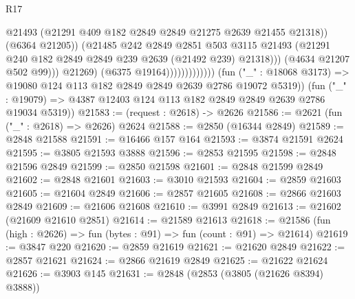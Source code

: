 \begin{lexlean}{R17}
\begin{coremodule}
                                            @21493
                                            (@21291
                                              @409
                                              @182
                                              @2849
                                              @2849
                                              @21275
                                              @2639
                                              @21455
                                              @21318))
                                          (@6364 @21205))
                                        (@21485
                                          @242
                                          @2849
                                          @2851
                                          @503
                                          @3115
                                          @21493
                                          (@21291
                                            @240
                                            @182
                                            @2849
                                            @2849
                                            @239
                                            @2639
                                            (@21492 @239)
                                            @21318)))
                                      (@4634 @21207 @502 @99)))
                                  @21269)
                                (@6375 @19164)))))))))))))
        (fun ("_" : @18068 @3173) => @19080 @124 @113 @182 @2849 @2849 @2639 @2786 @19072 @5319))
      (fun ("_" : @19079) => @4387 @12403 @124 @113 @182 @2849 @2849 @2639 @2786 @19034 @5319))
@21583 := (request : @2618) -> @2626
@21586 := @2621 (fun ("_" : @2618) => @2626) @2624
@21588 := @2850 (@16344 @2849)
@21589 := @2848 @21588
@21591 := @16466 @157 @164
@21593 := @3874 @21591 @2624
@21595 := @3805 @21593 @3888
@21596 := @2853 @21595
@21598 := @2848 @21596 @2849
@21599 := @2850 @21598
@21601 := @2848 @21599 @2849
@21602 := @2848 @21601
@21603 := @3010 @21593
@21604 := @2859 @21603
@21605 := @21604 @2849
@21606 := @2857 @21605
@21608 := @2866 @21603 @2849
@21609 := @21606 @21608
@21610 := @3991 @2849
@21613 := @21602 (@21609 @21610 @2851)
@21614 := @21589 @21613
@21618 := @21586 (fun (high : @2626) => fun (bytes : @91) => fun (count : @91) => @21614)
@21619 := @3847 @220
@21620 := @2859 @21619
@21621 := @21620 @2849
@21622 := @2857 @21621
@21624 := @2866 @21619 @2849
@21625 := @21622 @21624
@21626 := @3903 @145
@21631 := @2848 (@2853 (@3805 (@21626 @8394) @3888))

\end{coremodule}
\end{lexlean}
